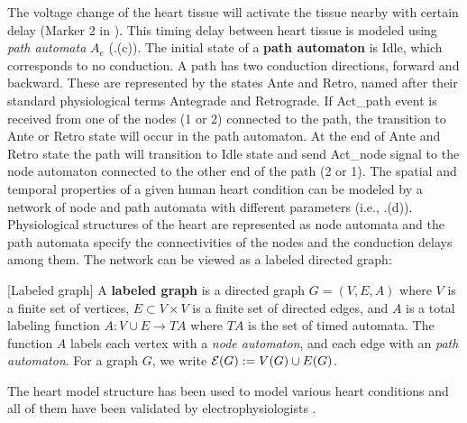 The voltage change of the heart tissue will activate the tissue nearby with certain delay (Marker 2 in ). 
This timing delay between heart tissue is modeled using \emph{path automata} $A_e$ (.(c)). 
The initial state of a \textbf{path automaton} is \textsf{Idle}, which corresponds to no conduction. 
A path has two conduction directions, forward and backward.
These are represented by the states \textsf{Ante} and \textsf{Retro}, named after their standard physiological terms Antegrade and Retrograde.
If \textsf{Act\_path} event is received from one of the nodes (1 or 2) connected to the path, the transition to \textsf{Ante} or \textsf{Retro} state will occur in the path automaton. 
At the end of \textsf{Ante} and \textsf{Retro} state the path will transition to \textsf{Idle} state and send Act\_node signal to the node automaton connected to the other end of the path (2 or 1).
The spatial and temporal properties of a given human heart condition can be modeled by a network of node and path automata with different parameters (i.e., .(d)). Physiological structures of the heart are represented as node automata and the path automata specify the connectivities of the nodes and the conduction delays among them. 
The network can be viewed as a labeled directed graph: %
\begin{defn}
	\label{def:labeledGraph}
	[Labeled graph]
	A \textbf{labeled graph} is a directed graph $G = (V,E,A)$ where 
	$V$ is a finite set of vertices, $E \subset V\times V$ is a finite set of directed edges,
	and $A$ is a total labeling function $A: V \cup E \rightarrow TA$
	where $TA$ is the set of timed automata.
	The function $A$ labels each vertex with a \emph{node automaton}, and each edge with an \emph{path automaton}.
	For a graph $G$, we write $\mathcal{E}(G) := V(G) \cup E(G)$.
\end{defn}
The heart model structure has been used to model various heart conditions and all of them have been validated by electrophysiologists \cite{vhm_ecrts10,vhm_embc10}.



